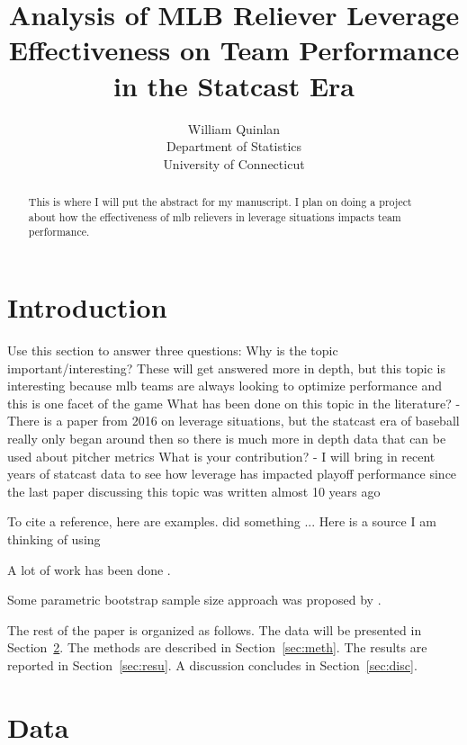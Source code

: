 \documentclass[12pt]{article}
\title{Analysis of MLB Reliever Leverage Effectiveness on Team Performance in the Statcast Era}
\author{William Quinlan\\
  Department of Statistics\\
  University of Connecticut
}
\begin{document}
\maketitle

\begin{abstract}
This is where I will put the abstract for my manuscript. I plan on doing a project about how the effectiveness of mlb relievers in leverage situations impacts team performance. 
\end{abstract}

\doublespacing

\section{Introduction}
\label{sec:intro}

Use this section to answer three questions:
Why is the topic important/interesting? These will get answered more in depth, but this topic is interesting because mlb teams are always looking to optimize performance and this is one facet of the game
What has been done on this topic in the literature? - There is a paper from 2016 on leverage situations, but the statcast era of baseball really only began around then so there is much more in depth data that can be used about pitcher metrics
What is your contribution? - I will bring in recent years of statcast data to see how leverage has impacted playoff performance since the last paper discussing this topic was written almost 10 years ago

\lipsum[1]

To cite a reference, here are examples.
\citet{xie2015dynamic} did something ... \lipsum[1]
Here is a source I am thinking of using
\citet{wdm2015consistency}

A lot of work has been done \citep[e.g.,][]{xie2015dynamic}.

\lipsum[2]

Some parametric bootstrap sample size approach was proposed by
\citep{dwivedi2017analysis}. 


The rest of the paper is organized as follows.
The data will be presented in Section~\ref{sec:data}.
The methods are described in Section~\ref{sec:meth}.
The results are reported in Section~\ref{sec:resu}.
A discussion concludes in Section~\ref{sec:disc}.


\section{Data}
\label{sec:data}
\end{document}
